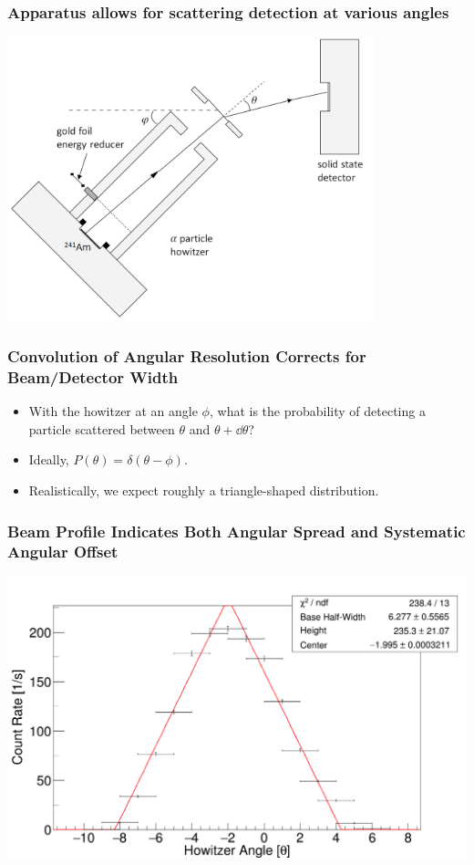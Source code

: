 \documentclass{beamer}
\begin{document}
\begin{frame}
  \frametitle{Apparatus allows for scattering detection at various angles}
  \begin{center}
  \includegraphics[width=0.8\textwidth]{apparatus}
\end{center}
\end{frame}

\begin{frame}
  \frametitle{Convolution of Angular Resolution Corrects for Beam/Detector Width}
  \begin{itemize}
    \item With the howitzer at an angle $\phi$, what is the probability of detecting a particle scattered between $\theta$ and $\theta + \dd{\theta}$?
      \pause
    \item Ideally, $P(\theta) = \delta(\theta-\phi)$.
      \pause
    \item Realistically, we expect roughly a triangle-shaped distribution.

  \end{itemize}
    \end{frame}

    \begin{frame}
      \frametitle{Beam Profile Indicates Both Angular Spread and Systematic Angular Offset }
      \includegraphics[width=1\textwidth]{c1.png}
    \end{frame}
\end{document}

